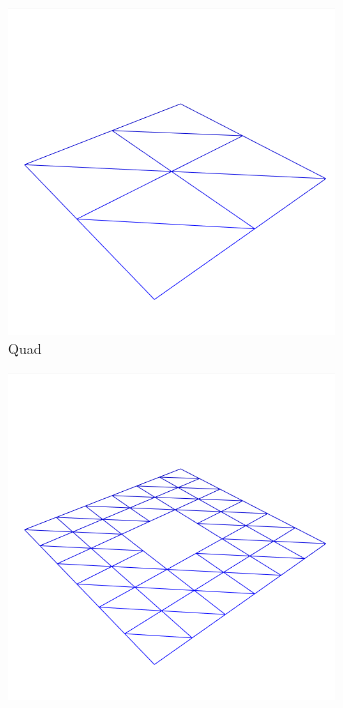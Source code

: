 \documentclass[crop=false,10pt,ngerman]{standalone}
\begin{document}
      \begin{figure}[h]
        \begin{subfigure}[b]{0.24\textwidth}
          \center
          \includegraphics[trim={0 0 0 2cm},clip,width=0.95\textwidth]{images/model-quad-1.png}
          \caption{Quad}
        \end{subfigure}
        \begin{subfigure}[b]{0.24\textwidth}
          \center
          \includegraphics[trim={0 0 0 2cm},clip,width=0.95\textwidth]{images/model-ring-1.png}

\end{subfigure}
\end{figure}
\end{document}
